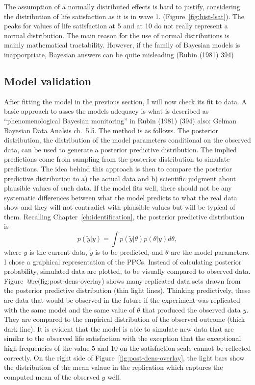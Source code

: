 \documentclass[a4, 12pt]{article}
\begin{document}
The assumption of a normally distributed effects is hard to justify, considering the distribution of life satisfaction as it is in wave 1. (Figure~\ref{fig:hist-lsat}). The peaks for values of life satisfaction at 5 and at 10 do not really represent a normal distribution. The main reason for the use of normal distributions is mainly mathematical tractability. However, if the family of Bayesian models is inapporpriate, Bayesian answers can be quite misleading (Rubin (1981) 394)

\hypertarget{model-validation}{%
\subsection{Model validation}\label{model-validation}}

\label{sec:validation}
After fitting the model in the previous section, I will now check its fit to data. A basic approach to asses the models adequacy is what is described as ``phenomenological Bayesian monitoring'' in Rubin (1981) (394) also: Gelman Bayesian Data Analsis ch.~5.5. The method is as follows. The posterior distribution, the distribution of the model parameters conditional on the observed data, can be used to generate a posterior predictive distribution. The implied predictions come from sampling from the posterior distribution to simulate predictions. The idea behind this approach is then to compare the posterior predictive distribution to a) the actual data and b) scientific judgment about plausible values of such data. If the model fits well, there should not be any systematic differences between what the model predicts to what the real data show and they will not contradict with plausible values but will be typical of them. Recalling Chapter~\ref{ch:identification}, the posterior predictive distribution is
\[p(\tilde{y}|y) =\int p(\tilde{y}|\theta)p(\theta|y)d\theta,\]
where \(y\) is the current data, \(\tilde y\) is to be predicted, and \(\theta\) are the model parameters.
I chose a graphical representation of the PPCs. Instead of calculating posterior probability, simulated data are plotted, to be visually compared to observed data.
Figure~@re(fig:post-dens-overlay) shows many replicated data sets drawn from the posterior predictive distribution (thin light lines). Thinking predictively, these are data that would be observed in the future if the experiment was replicated with the same model and the same value of \(\theta\) that produced the observed data \(y\). They are compared to the empirical distribution of the observed outcome (thick dark line). It is evident that the model is able to simulate new data that are similar to the observed life satisfaction with the exception that the exceptional high frequencies of the value 5 and 10 on the satisfaction scale cannot be reflected correctly.
On the right side of Figure~\ref{fig:post-dens-overlay}, the light bars show the distribution of the mean valaue in the replication which captures the computed mean of the observed \(y\) well.
\end{document}
